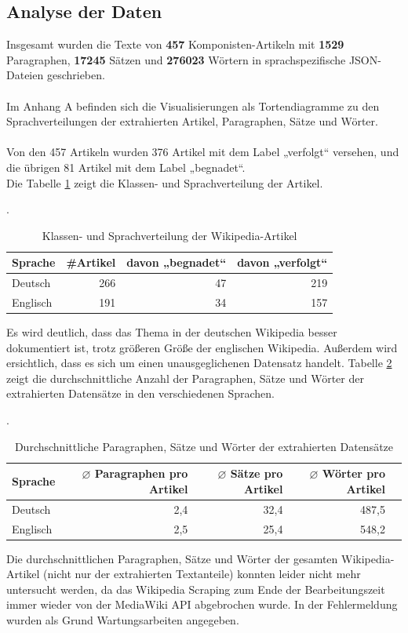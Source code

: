 \documentclass[ngerman]{ttlab-qualify}
\begin{document}
\subsection{Analyse der Daten} \label{Analyse}
Insgesamt wurden die Texte von \textbf{457} Komponisten-Artikeln mit \textbf{1529} Paragraphen, \textbf{17245} Sätzen und \textbf{276023} Wörtern in sprachspezifische JSON-Dateien geschrieben.\\
\\
Im Anhang A befinden sich die Visualisierungen als Tortendiagramme zu den Sprachverteilungen der extrahierten Artikel, Paragraphen, Sätze und Wörter.\\
\\
Von den 457 Artikeln wurden  376 Artikel mit dem Label „verfolgt“ versehen, und die übrigen 81 Artikel mit dem Label „begnadet“. \\
Die Tabelle \ref{tab:Klassenverteilung} zeigt die Klassen- und Sprachverteilung der Artikel.\\ 
\begin{table}[H]
    \centering
    \caption{Klassen- und Sprachverteilung der Wikipedia-Artikel}.
    \begin{tabular}[h]{lrrr}
    \toprule
    Sprache & \#Artikel &  davon „begnadet“ &  davon „verfolgt“\\
    \midrule
    Deutsch & 266 & 47 & 219 \\
    Englisch & 191 & 34 & 157 \\
    \bottomrule
    \end{tabular} 
    \label{tab:Klassenverteilung}
\end{table} 
\noindent Es wird deutlich, dass das Thema in der deutschen Wikipedia besser dokumentiert ist, trotz größeren Größe der englischen Wikipedia. Außerdem wird ersichtlich, dass es sich um einen unausgeglichenen Datensatz handelt. Tabelle \ref{tab:Scraped_Verteilung} zeigt die durchschnittliche Anzahl der Paragraphen, Sätze und Wörter der extrahierten Datensätze in den verschiedenen Sprachen. 
\begin{table}[H]
    \centering  
    \caption{Durchschnittliche Paragraphen, Sätze und Wörter der extrahierten Datensätze}.
    \begin{tabular}[h]{lrrrr}
    \toprule
    Sprache &  \(\varnothing\) Paragraphen pro Artikel &  \(\varnothing\) Sätze pro Artikel &  \(\varnothing\) Wörter pro Artikel\\
    \midrule
    Deutsch & 2,4 & 32,4 & 487,5 \\
    Englisch & 2,5 & 25,4 & 548,2 \\
    \bottomrule
    \end{tabular} 
    \label{tab:Scraped_Verteilung}
\end{table}
\noindent Die durchschnittlichen Paragraphen, Sätze und Wörter der gesamten Wikipedia-Artikel (nicht nur der extrahierten Textanteile) konnten leider nicht mehr untersucht werden, da das Wikipedia Scraping zum Ende der Bearbeitungszeit immer wieder von der MediaWiki API abgebrochen wurde. In der Fehlermeldung wurden als Grund Wartungsarbeiten angegeben.
\end{document}
